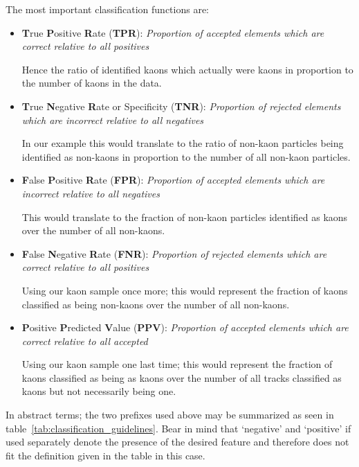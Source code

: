 The most important classification functions are:
\begin{itemize}
    \item \textbf{T}rue \textbf{P}ositive \textbf{R}ate (\textbf{TPR}): \textit{Proportion of accepted elements which are correct relative to all positives}

    \nobreak
    Hence the ratio of identified kaons which actually were kaons in proportion to the number of kaons in the data.

    \item \textbf{T}rue \textbf{N}egative \textbf{R}ate or Specificity (\textbf{TNR}): \textit{Proportion of rejected elements which are incorrect relative to all negatives}

    \nobreak
    In our example this would translate to the ratio of non-kaon particles being identified as non-kaons in proportion to the number of all non-kaon particles.

    \item \textbf{F}alse \textbf{P}ositive \textbf{R}ate (\textbf{FPR}): \textit{Proportion of accepted elements which are incorrect relative to all negatives}

    \nobreak
    This would translate to the fraction of non-kaon particles identified as kaons over the number of all non-kaons.

    \item \textbf{F}alse \textbf{N}egative \textbf{R}ate (\textbf{FNR}): \textit{Proportion of rejected elements which are correct relative to all positives}

    \nobreak
    Using our kaon sample once more; this would represent the fraction of kaons classified as being non-kaons over the number of all non-kaons.

    \item \textbf{P}ositive \textbf{P}redicted \textbf{V}alue (\textbf{PPV}): \textit{Proportion of accepted elements which are correct relative to all accepted}

    \nobreak
    Using our kaon sample one last time; this would represent the fraction of kaons classified as being as kaons over the number of all tracks classified as kaons but not necessarily being one.

\end{itemize}

In abstract terms; the two prefixes used above may be summarized as seen in table~\ref{tab:classification_guidelines}. Bear in mind that `negative' and `positive' if used separately denote the presence of the desired feature and therefore does not fit the definition given in the table in this case.

